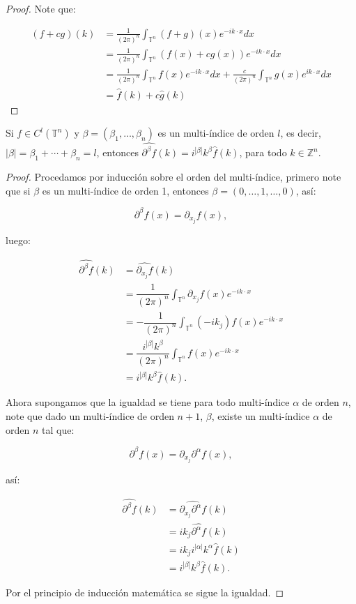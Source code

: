 \documentclass[12pt]{article}
\newcommand\T{\mathbb{T}}
\renewcommand{\hat}{\widehat}
\begin{document}
\begin{proof}
Note que:

$$
\begin{aligned}
(f+c g)(k) & =\frac{1}{(2\pi)^n}\int_{\T^n}(f+g)(x) e^{-i k \cdot x} d x \\
& =\frac{1}{(2\pi)^n}\int_{\T^n}(f(x)+c g(x)) e^{-i k \cdot x} d x \\
& =\frac{1}{(2\pi)^n}\int_{\T^n} f(x) e^{-i k \cdot x} d x+\frac{c}{(2\pi)^n} \int_{\T^n} g(x) e^{i k \cdot x} d x \\
& =\hat{f}(k)+c\hat{g}(k)
\end{aligned}
$$
\end{proof}

\begin{theorem}\label{derivadacacorra}
Si $f \in C^l\left(\mathbb{T}^n\right)$ y $\beta=\left(\beta_1, \ldots, \beta_n\right)$ es un multi-índice de orden $l$, es decir, $|\beta|=\beta_1+\cdots+\beta_n=l$, entonces $\widehat{\partial^\beta f}(k)=i^{|\beta|} k^\beta \widehat{f}(k)$, para todo $k \in \mathbb{Z}^n$.
\end{theorem}

\begin{proof}
Procedamos  por inducción sobre el orden del multi-índice, primero note que si $\beta$ es un multi-índice de orden 1, entonces $\beta=(0,\ldots,1,\ldots,0)$, así:

$$\partial^{\beta}f(x)=\partial_{x_j}f(x),$$

luego:

\begin{align*}
    \widehat{\partial^{\beta}f}(k)&=\widehat{\partial_{x_j}f}(k)\\
    &=\dfrac{1}{(2\pi)^n}\int_{\T^n}\partial_{x_j}f(x)e^{-ik\cdot x}\\
    &=-\dfrac{1}{(2\pi)^n}\int_{\T^n}(-ik_j)f(x)e^{-ik\cdot x}\\
    &=\dfrac{i^{|\beta|}k^{\beta}}{(2\pi)^n}\int_{\T^n}f(x)e^{-ik\cdot x}\\
    &=i^{|\beta|}k^{\beta}\hat{f}(k)
.\end{align*}

Ahora supongamos que la igualdad se tiene para todo multi-índice $\alpha$ de orden $n$, note que dado un multi-índice de orden $n+1$, $\beta$, existe un multi-índice $\alpha$ de orden $n$ tal que:

$$\partial^{\beta}f(x)=\partial_{x_j}\partial^{\alpha}f(x),$$

así:

\begin{align*}
    \widehat{\partial^{\beta}f}(k)&=\widehat{\partial_{x_j}\partial^{\alpha}f}(k)\\
    &=ik_j\widehat{\partial^{\alpha}f}(k)\\
    &=ik_ji^{|\alpha|}k^{\alpha}\hat{f}(k)\\
    &=i^{|\beta|}k^{\beta}\hat{f}(k)
.\end{align*}

Por el principio de inducción matemática se sigue la igualdad.

\end{proof}
\end{document}
